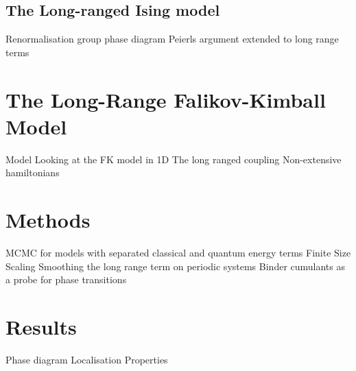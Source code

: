 \subsection{The Long-ranged Ising model}
		Renormalisation group phase diagram
		Peierls argument extended to long range terms

\section{The Long-Range Falikov-Kimball Model}
        Model
		Looking at the FK model in 1D
		The long ranged coupling
		Non-extensive hamiltonians

\section{Methods}
		MCMC for models with separated classical and quantum energy terms
		Finite Size Scaling 
        Smoothing the long range term on periodic systems
        Binder cumulants as a probe for phase transitions
		
\section{Results}
		Phase diagram
		Localisation Properties
